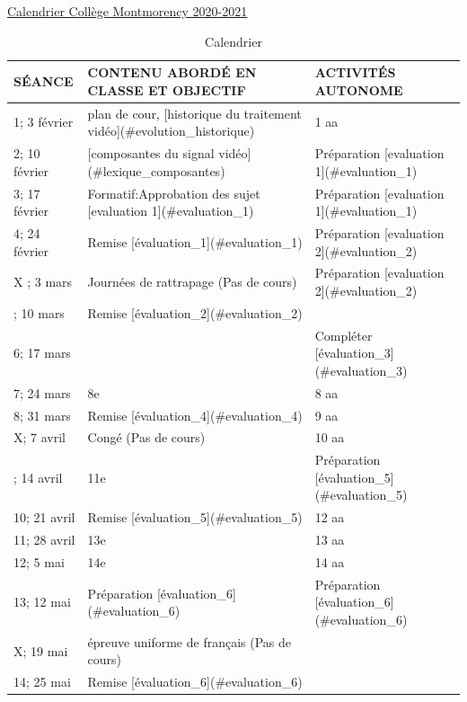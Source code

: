 \documentclass[
]{book}
\begin{document}
\href{https://www.cmontmorency.qc.ca/wp-content/uploads/images/college/administration/CALENDRIER-SCOLAIRE-2020-2021.pdf}{Calendrier Collège Montmorency 2020-2021}

\begin{table}

\caption{\label{tab:calendrier}Calendrier}
\centering
\begin{tabular}[t]{lll}
\toprule
SÉANCE & CONTENU ABORDÉ EN CLASSE ET OBJECTIF & ACTIVITÉS AUTONOME\\
\midrule
1; 3 février & plan de cour, [historique du traitement vidéo](\#evolution\_historique) & 1 aa\\
2; 10 février & [composantes du signal vidéo](\#lexique\_composantes) & Préparation [evaluation 1](\#evaluation\_1)\\
3; 17 février & Formatif:Approbation des sujet [evaluation 1](\#evaluation\_1) & Préparation [evaluation 1](\#evaluation\_1)\\
4; 24 février & Remise [évaluation\_1](\#evaluation\_1) & Préparation [evaluation 2](\#evaluation\_2)\\
X ; 3 mars & Journées de rattrapage (Pas de cours) & Préparation [evaluation 2](\#evaluation\_2)\\
\addlinespace
5; 10 mars & Remise [évaluation\_2](\#evaluation\_2) & \\
6; 17 mars &  & Compléter [évaluation\_3](\#evaluation\_3)\\
7; 24 mars & 8e & 8 aa\\
8; 31 mars & Remise [évaluation\_4](\#evaluation\_4) & 9 aa\\
X; 7 avril & Congé (Pas de cours) & 10 aa\\
\addlinespace
9; 14 avril & 11e & Préparation [évaluation\_5](\#evaluation\_5)\\
10; 21 avril & Remise [évaluation\_5](\#evaluation\_5) & 12 aa\\
11; 28 avril & 13e & 13 aa\\
12; 5 mai & 14e & 14 aa\\
13; 12 mai & Préparation [évaluation\_6](\#evaluation\_6) & Préparation [évaluation\_6](\#evaluation\_6)\\
\addlinespace
X; 19 mai & épreuve uniforme de français (Pas de cours) & \\
14; 25 mai & Remise [évaluation\_6](\#evaluation\_6) & \\
\bottomrule
\end{tabular}
\end{table}
\end{document}

